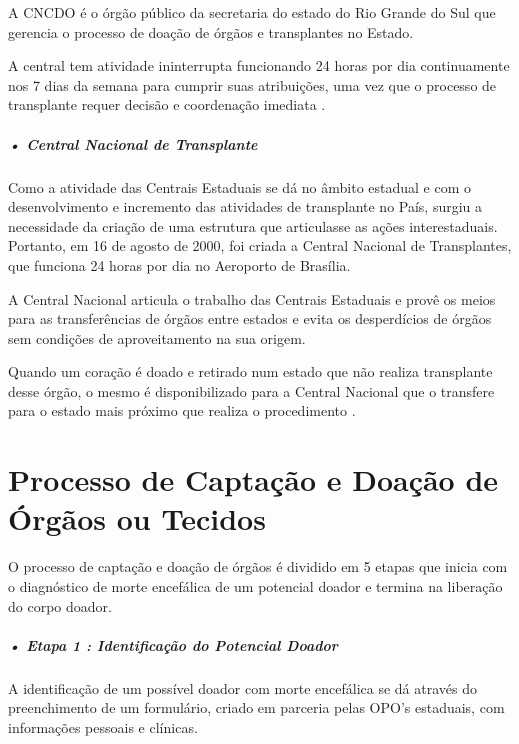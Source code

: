 \documentclass[portuguese,oneside]{tcc}
\begin{document}
A CNCDO é o órgão público da secretaria do estado do Rio Grande do Sul que gerencia o processo de doação de órgãos e transplantes no Estado.

A central tem atividade ininterrupta funcionando 24 horas por dia continuamente nos 7 dias da semana para cumprir suas atribuições, uma vez que o processo de transplante requer decisão e coordenação imediata \cite{SCSCT}.

\subparagraph{• Central Nacional de Transplante}
Como a atividade das Centrais Estaduais se dá no âmbito estadual e com o desenvolvimento e incremento das atividades de transplante no País, surgiu a necessidade da criação de uma estrutura que articulasse as ações interestaduais. Portanto, em 16 de agosto de 2000, foi criada a Central Nacional de Transplantes, que funciona 24 horas por dia no Aeroporto de Brasília. 

A Central Nacional articula o trabalho das Centrais Estaduais e provê os meios para as transferências de órgãos entre estados e evita os desperdícios de órgãos sem condições de aproveitamento na sua origem. 

Quando um coração é doado e retirado num estado que não realiza transplante desse órgão, o mesmo é disponibilizado para a Central Nacional que o transfere para o estado mais próximo que realiza o procedimento \cite{SCSCT}.

\section{Processo de Captação e Doação de Órgãos ou Tecidos} \label{tab:processo-captacao-doacao}
O processo de captação e doação de órgãos é dividido em 5 etapas \cite{EPRECISOEDUCAR} que inicia com o diagnóstico de morte encefálica de um potencial doador e termina na liberação do corpo doador.

\subparagraph{• Etapa 1 : Identificação do Potencial Doador}

A identificação de um possível doador com morte encefálica se dá através do preenchimento de um formulário, criado em parceria pelas OPO’s estaduais, com informações pessoais e clínicas.
\end{document}
